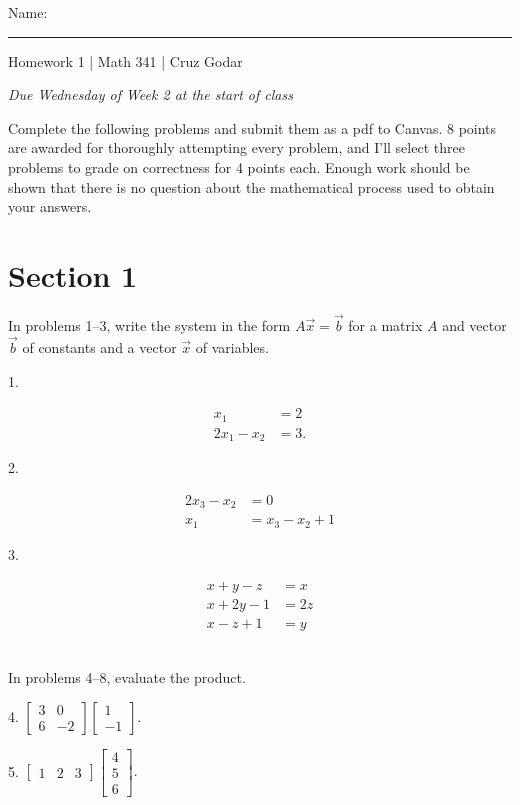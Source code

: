 \documentclass{article}
\begin{document}
\Large Name: \rule{2in}{0.15mm} \hfill Homework 1 | Math 341 | Cruz Godar \vspace{4pt} \normalsize

\textit{Due Wednesday of Week 2 at the start of class}

Complete the following problems and submit them as a pdf to Canvas. 8 points are awarded for thoroughly attempting every problem, and I'll select three problems to grade on correctness for 4 points each. Enough work should be shown that there is no question about the mathematical process used to obtain your answers.

\section{Section 1}

In problems 1--3, write the system in the form $A\vec{x} = \vec{b}$ for a matrix $A$ and vector $\vec{b}$ of constants and a vector $\vec{x}$ of variables.

1.

\begin{align*}
	x_1 &= 2\\
	2x_1 - x_2 &= 3.
\end{align*}

2.

\begin{align*}
	2x_3 - x_2 &= 0\\
	x_1 &= x_3 - x_2 + 1
\end{align*}

3.

\begin{align*}
	x + y - z &= x\\
	x + 2y - 1 &= 2z\\
	x - z + 1 &= y
\end{align*}

~\\

In problems 4--8, evaluate the product.

4. $\displaystyle \left[\begin{array}{cc}3& 0 \\ 6& -2\end{array}\right]\left[\begin{array}{c}1 \\ -1\end{array}\right].$

5. $\displaystyle \left[\begin{array}{ccc}1& 2& 3\end{array}\right]\left[\begin{array}{c}4 \\ 5 \\ 6\end{array}\right].$
\end{document}
